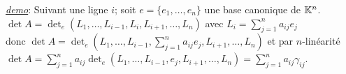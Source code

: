 \underline{\textit{demo}}: Suivant une ligne $i$; soit $e=\{e_1,\dots,e_n\}$ une base canonique de $\mathbb{K}^n$.\\
$\displaystyle\det A =\det_e(L_1,\dots,L_{i-1},L_{i},L_{i+1},\dots,L_n)$ avec $\displaystyle L_i=\sum_{j=1}^n a_{ij}e_j$\\
donc $\displaystyle \det A =\det_e(L_1,\dots,L_{i-1},\sum_{j=1}^n a_{ij}e_j,L_{i+1},\dots,L_n)$ et par $n$-linéarité\\
$\displaystyle \det A =\sum_{j=1}^n a_{ij}\det_e(L_1,\dots,L_{i-1},e_j,L_{i+1},\dots,L_n)=\sum_{j=1}^n a_{ij}\gamma_{ij}$.